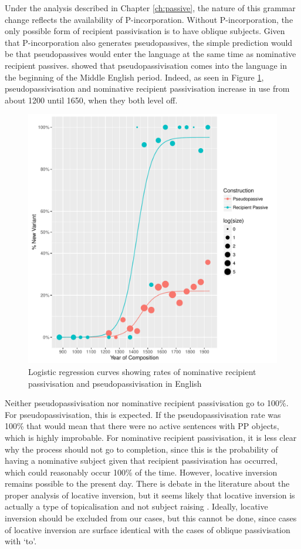 	Under the analysis described in Chapter \ref{ch:passive}, the nature of this grammar change reflects the availability of P-incorporation. Without P-incorporation, the only possible form of recipient passivisation is to have oblique subjects. Given that P-incorporation also generates pseudopassives, the simple prediction would be that pseudopassives would enter the language at the same time as nominative recipient passives. \cite{Sigursson.2014} showed that pseudopassivisation comes into the language in the beginning of the Middle English period. Indeed, as seen in Figure \ref{fig:recpas-pseudo}, pseudopassivisation and nominative recipient passivisation increase in use from about 1200 until 1650, when they both level off.

	\begin{figure}[ht!]
		\includegraphics[width=\linewidth]{../images/recpas-pseudo}
		\caption{Logistic regression curves showing rates of nominative recipient passivisation and pseudopassivisation in English}
		\label{fig:recpas-pseudo}
	\end{figure}

	Neither pseudopassivisation nor nominative recipient passivisation go to 100\%. For pseudopassivisation, this is expected. If the pseudopassivisation rate was 100\% that would mean that there were no active sentences with PP objects, which is highly improbable. For nominative recipient passivisation, it is less clear why the process should not go to completion, since this is the probability of having a nominative subject given that recipient passivisation has occurred, which could reasonably occur 100\% of the time. However, locative inversion remains possible to the present day. There is debate in the literature about the proper analysis of locative inversion, but it seems likely that locative inversion is actually a type of topicalisation and not subject raising \citep{Bresnan.1994}. Ideally, locative inversion should be excluded from our cases, but this cannot be done, since cases of locative inversion are surface identical with the cases of oblique passivisation with `to'.


